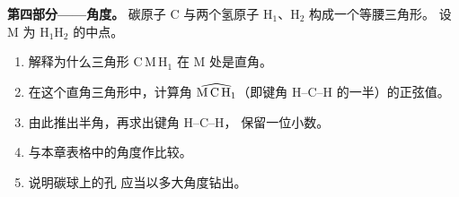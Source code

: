 \begin{problem}
\medskip
\noindent\textbf{第四部分——角度。}
碳原子 C 与两个氢原子 H$_1$、H$_2$ 构成一个等腰三角形。
设 M 为 H$_1$H$_2$ 的中点。
\begin{enumerate}[resume]
  \item 解释为什么三角形 C\,M\,H$_1$ 在 M 处是直角。
  \item 在这个直角三角形中，计算角
        $\widehat{\text{M\,C\,H}_1}$（即键角 H--C--H 的一半）的正弦值。
  \item 由此推出半角，再求出键角 H--C--H，
        保留一位小数。
  \item 与本章表格中的角度作比较。
  \item 说明碳球上的孔
        应当以多大角度钻出。
\end{enumerate}
\end{problem}
